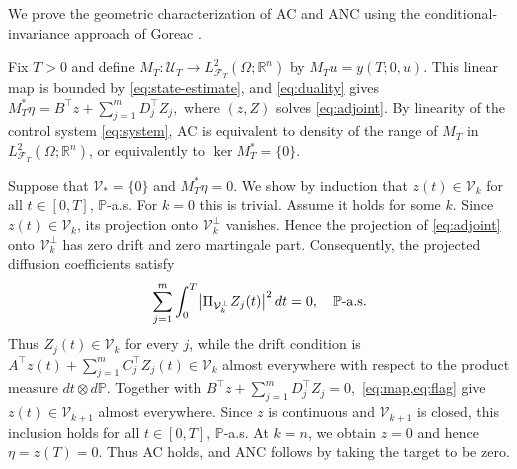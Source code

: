 \documentclass[twocolumn]{autart}
\newcounter{part}
\begin{document}
We prove the geometric characterization of AC and ANC using the
conditional-invariance approach of Goreac \cite[Theorem~3]{Goreac}.

\vspace{-4mm}
\begin{pf}
Fix $T>0$ and define
$M_T:\mathcal U_T\to L^2_{\mathcal F_T}(\Omega;\mathbb R^n)$ by
$M_Tu=y(T;0,u)$. This linear map is bounded by
\cref{eq:state-estimate}, and \cref{eq:duality} gives $
M_T^*\eta=B^{\top}z+\sum_{j=1}^mD_j^{\top}Z_j,$
where $(z,Z)$ solves \cref{eq:adjoint}. By linearity of the control system \eqref{eq:system}, AC is equivalent to density of the range of $M_T$ in
$L^2_{\mathcal F_T}(\Omega;\mathbb R^n)$, or equivalently to
$\ker M_T^*=\{0\}$.

Suppose that $\mathcal V_*=\{0\}$ and $M_T^*\eta=0$. We show by
induction that $z(t)\in\mathcal V_k$ for all $t\in[0,T]$, $\mathbb P$-a.s.
For $k=0$ this is trivial. Assume it holds for some $k$. Since
$z(t)\in\mathcal V_k$, its projection onto $\mathcal V_k^\perp$
vanishes. Hence the projection of \cref{eq:adjoint} onto
$\mathcal V_k^\perp$ has zero drift and zero martingale part.
Consequently, the projected diffusion coefficients satisfy\vspace{-2mm}
\begin{equation*}
\sum_{j=1}^m\int_0^T
\bigl|\Pi_{\mathcal V_k^\perp}Z_j(t)\bigr|^2\,dt=0,
\quad\mathbb P\text{-a.s.}\vspace{-2mm}
\end{equation*}
Thus $Z_j(t)\in\mathcal V_k$ for every $j$, while the drift condition
is $
A^{\top}z(t)+\sum\limits_{j=1}^mC_j^{\top}Z_j(t)\in\mathcal V_k$
almost everywhere with respect to the product measure
$dt\otimes d\mathbb P$. Together with
$
B^{\top}z+\sum\limits_{j=1}^mD_j^{\top}Z_j=0,
$
\cref{eq:map,eq:flag} give $z(t)\in\mathcal V_{k+1}$ almost everywhere.
Since $z$ is continuous and $\mathcal V_{k+1}$ is closed, this inclusion
holds for all $t\in[0,T]$, $\mathbb P$-a.s.  At $k=n$, we obtain $z=0$
and hence $\eta=z(T)=0$. Thus AC holds, and ANC follows by taking the
target to be zero.


\end{pf}
\end{document}
